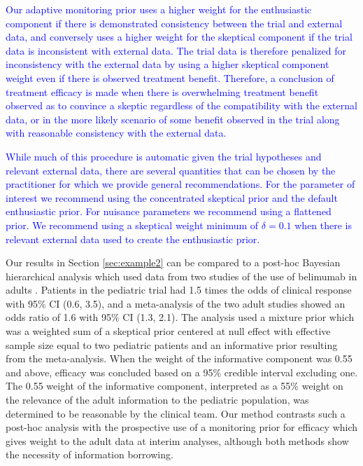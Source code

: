 \documentclass[AMA,STIX1COL,doublespace]{WileyNJD-v2}
\begin{document}
\textcolor{blue}{Our adaptive monitoring prior uses a higher weight for the enthusiastic component if there is demonstrated consistency between the trial and external data, and conversely uses a higher weight for the skeptical component if the trial data is inconsistent with external data. The trial data is therefore penalized for inconsistency with the external data by using a higher skeptical component weight even if there is observed treatment benefit. Therefore, a conclusion of treatment efficacy is made when there is overwhelming treatment benefit observed as to convince a skeptic regardless of the compatibility with the external data, or in the more likely scenario of some benefit observed in the trial along with reasonable consistency with the external data.}

\textcolor{blue}{While much of this procedure is automatic given the trial hypotheses and relevant external data, there are several quantities that can be chosen by the practitioner for which we provide general recommendations. For the parameter of interest we recommend using the concentrated skeptical prior and the default enthusiastic prior. For nuisance parameters we recommend using a flattened prior. We recommend using a skeptical weight minimum of $\delta=0.1$ when there is relevant external data used to create the enthusiastic prior.}

Our results in Section \ref{sec:example2} can be compared to a post-hoc Bayesian hierarchical analysis which used data from two studies of the use of belimumab in adults \citep{Brunner2020}. Patients in the pediatric trial had 1.5 times the odds of clinical response with 95\% CI (0.6, 3.5), and a meta-analysis of the two adult studies showed an odds ratio of 1.6 with 95\% CI (1.3, 2.1). The analysis used a mixture prior which was a weighted sum of a skeptical prior centered at null effect with effective sample size equal to two pediatric patients and an informative prior resulting from the meta-analysis. When the weight of the informative component was 0.55 and above, efficacy was concluded based on a 95\% credible interval excluding one. The 0.55 weight of the informative component, interpreted as a 55\% weight on the relevance of the adult information to the pediatric population, was determined to be reasonable by the clinical team. Our method contrasts such a post-hoc analysis with the prospective use of a monitoring prior for efficacy which gives weight to the adult data at interim analyses, although both methods show the necessity of information borrowing. %
\end{document}

